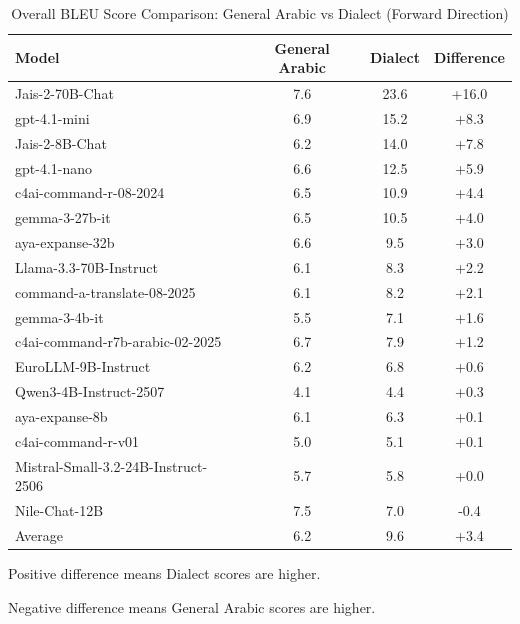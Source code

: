 \begin{table}[h]
\centering
\caption{Overall BLEU Score Comparison: General Arabic vs Dialect (Forward Direction)}
\label{tab:overall-general-dialect-difference}
\begin{tabular}{lccc}
\toprule
Model & General Arabic & Dialect & Difference \\
\midrule
Jais-2-70B-Chat & 7.6 & 23.6 & +16.0 \\
gpt-4.1-mini & 6.9 & 15.2 & +8.3 \\
Jais-2-8B-Chat & 6.2 & 14.0 & +7.8 \\
gpt-4.1-nano & 6.6 & 12.5 & +5.9 \\
c4ai-command-r-08-2024 & 6.5 & 10.9 & +4.4 \\
gemma-3-27b-it & 6.5 & 10.5 & +4.0 \\
aya-expanse-32b & 6.6 & 9.5 & +3.0 \\
Llama-3.3-70B-Instruct & 6.1 & 8.3 & +2.2 \\
command-a-translate-08-2025 & 6.1 & 8.2 & +2.1 \\
gemma-3-4b-it & 5.5 & 7.1 & +1.6 \\
c4ai-command-r7b-arabic-02-2025 & 6.7 & 7.9 & +1.2 \\
EuroLLM-9B-Instruct & 6.2 & 6.8 & +0.6 \\
Qwen3-4B-Instruct-2507 & 4.1 & 4.4 & +0.3 \\
aya-expanse-8b & 6.1 & 6.3 & +0.1 \\
c4ai-command-r-v01 & 5.0 & 5.1 & +0.1 \\
Mistral-Small-3.2-24B-Instruct-2506 & 5.7 & 5.8 & +0.0 \\
Nile-Chat-12B & 7.5 & 7.0 & -0.4 \\
\midrule
Average & 6.2 & 9.6 & +3.4 \\
\bottomrule
\end{tabular}
\begin{tablenotes}
\small
\item Positive difference means Dialect scores are higher.
\item Negative difference means General Arabic scores are higher.
\end{tablenotes}
\end{table}
